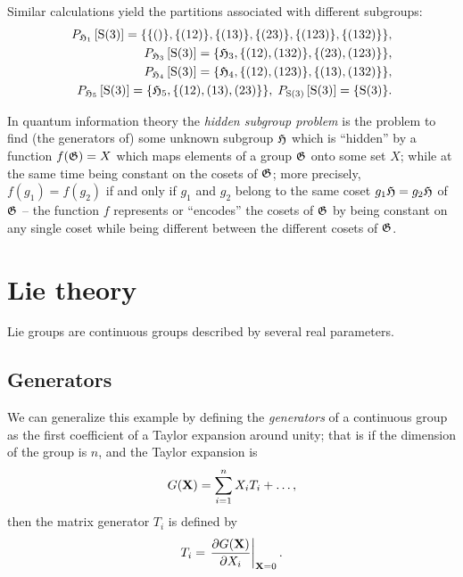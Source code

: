 {Similar calculations yield the partitions associated with different subgroups:
\begin{equation}
\begin{split}
P_{{\frak H}_1}\left[ \textrm{S}(3) \right] =
\{
\{()   \}  ,
\{(12) \}  ,
\{(13) \}  ,
\{(23) \}  ,
\{(123)\}  ,
\{(132)\}
\}  ,\\
P_{{\frak H}_3}\left[ \textrm{S}(3) \right] =
\{
{\frak H}_3,
\{ (12) , (132) \},
\{ (23) , (123) \}
\}  ,\\
%
P_{{\frak H}_4}\left[ \textrm{S}(3) \right] =
\{
{\frak H}_4,
\{ (12) , (123) \},
\{ (13) , (132) \}
\}  ,\\
%
P_{{\frak H}_5}\left[ \textrm{S}(3) \right] =
\{
{\frak H}_5,
\{ (12) , (13) ,(23) \}
\}  ,\;
%
P_{\textrm{S}(3)}\left[ \textrm{S}(3) \right]  =\{ \textrm{S}(3)\}
.
\end{split}
\end{equation}

\eexample
}

In quantum information theory
the {\em hidden subgroup problem}
is the problem to find (the generators of) some unknown
subgroup  ${\frak H}$
which is
``hidden'' by a
function $f({\frak G}) = X$
which maps elements of a group  ${\frak G}$
onto some set $X$;
while at the same time being constant on the cosets of ${\frak G}$;
more precisely, $f(g_1)=f(g_2)$ if and only if $g_1$ and $g_2$
belong to the same coset $g_1{\frak H}=g_2{\frak H}$ of ${\frak G}$
--
the function $f$ represents or ``encodes''
the cosets of ${\frak G}$ by being constant on any single coset
while being different between the different cosets of ${\frak G}$.

\section{Lie theory}

Lie groups\cite[-0mm]{hall-2000,hall-2015} are continuous groups described by several real parameters.

\subsection{Generators}
We can generalize this example by defining
the {\em generators}
of a continuous group as the first coefficient of a Taylor expansion
around unity; that is if the dimension of the group is $n$, and the Taylor expansion is
\begin{equation}
  G  ({\bf X}) =   \sum_{i=1}^n X_i   T  _i + \ldots ,
\end{equation}
then the matrix generator $T_i$ is defined by
\begin{equation}
  T  _i = \left. \frac{\partial   G  ({\bf X})}{\partial X_i} \right|_{ {\bf X}=0}.
\end{equation}


